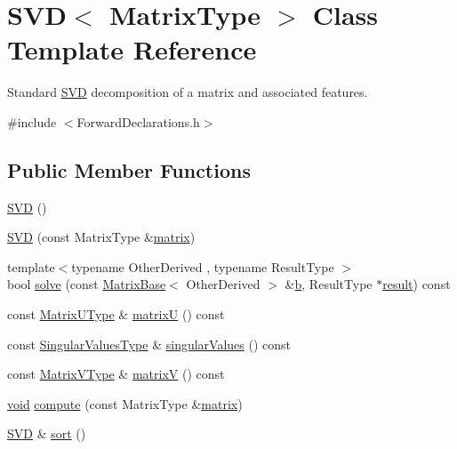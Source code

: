 \hypertarget{class_s_v_d}{\section{S\-V\-D$<$ Matrix\-Type $>$ Class Template Reference}
\label{class_s_v_d}
}


Standard \hyperlink{class_s_v_d}{S\-V\-D} decomposition of a matrix and associated features.  




{\ttfamily \#include $<$Forward\-Declarations.\-h$>$}

\subsection*{Public Member Functions}
\begin{DoxyCompactItemize}
\item 
\hyperlink{class_s_v_d_ac69bcb2519941cad511b93aa8610a946}{S\-V\-D} ()
\item 
\hyperlink{class_s_v_d_af1763b4cc91720d20d6e667682d3164b}{S\-V\-D} (const Matrix\-Type \&\hyperlink{glext_8h_a7b24a3f2f56eb1244ae69dacb4fecb6f}{matrix})
\item 
{\footnotesize template$<$typename Other\-Derived , typename Result\-Type $>$ }\\bool \hyperlink{class_s_v_d_a054826e4606e7f0faeb979c8352dbf92}{solve} (const \hyperlink{class_matrix_base}{Matrix\-Base}$<$ Other\-Derived $>$ \&\hyperlink{glext_8h_a6eba317e3cf44d6d26c04a5a8f197dcb}{b}, Result\-Type $\ast$\hyperlink{qxtslotjob_8h_aab161efab0511ea9612b64c40e9852ca}{result}) const 
\item 
const \hyperlink{class_matrix}{Matrix\-U\-Type} \& \hyperlink{class_s_v_d_aaa1e079c0b7ec932874f6579fd982a73}{matrix\-U} () const 
\item 
const \hyperlink{class_matrix}{Singular\-Values\-Type} \& \hyperlink{class_s_v_d_afc6c90f5cdf64cc5cc20b232a95c6d73}{singular\-Values} () const 
\item 
const \hyperlink{class_matrix}{Matrix\-V\-Type} \& \hyperlink{class_s_v_d_a234b5214713616e6cf574278787698e4}{matrix\-V} () const 
\item 
\hyperlink{group___u_a_v_objects_plugin_ga444cf2ff3f0ecbe028adce838d373f5c}{void} \hyperlink{class_s_v_d_a7854e0700e34748853299d44133a5c1f}{compute} (const Matrix\-Type \&\hyperlink{glext_8h_a7b24a3f2f56eb1244ae69dacb4fecb6f}{matrix})
\item 
\hyperlink{class_s_v_d}{S\-V\-D} \& \hyperlink{class_s_v_d_ac57eea9ae0e012b9ce78a5cc08172af0}{sort} ()

\end{DoxyCompactItemize}
